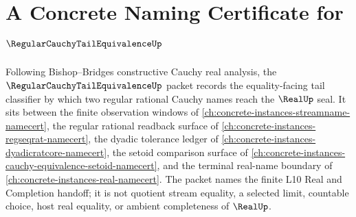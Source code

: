 \chapter{A Concrete Naming Certificate for $\RegularCauchyTailEquivalenceUp$}
\label{ch:concrete-instances-regular-cauchy-tail-equivalence-namecert}

Following Bishop--Bridges constructive Cauchy real analysis, the $\RegularCauchyTailEquivalenceUp$ packet records the equality-facing tail classifier by which two regular rational Cauchy names reach the $\RealUp$ seal. It sits between the finite observation windows of \autoref{ch:concrete-instances-streamname-namecert}, the regular rational readback surface of \autoref{ch:concrete-instances-regseqrat-namecert}, the dyadic tolerance ledger of \autoref{ch:concrete-instances-dyadicratcore-namecert}, the setoid comparison surface of \autoref{ch:concrete-instances-cauchy-equivalence-setoid-namecert}, and the terminal real-name boundary of \autoref{ch:concrete-instances-real-namecert}. The packet names the finite L10 Real and Completion handoff; it is not quotient stream equality, a selected limit, countable choice, host real equality, or ambient completeness of $\RealUp$.

